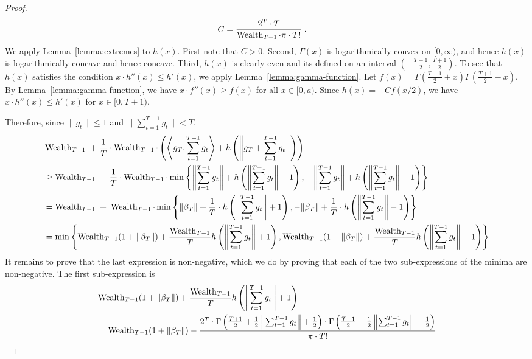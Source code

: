 \begin{proof}
\begin{align*}
C & = \frac{2^T \cdot T}{\operatorname{Wealth}_{T-1} \cdot \pi \cdot T!} \; .
\end{align*}
We apply Lemma~\ref{lemma:extremes} to $h(x)$. First note that $C > 0$. Second,
$\Gamma(x)$ is logarithmically convex on $[0,\infty)$, and hence $h(x)$ is
logarithmically concave and hence concave. Third, $h(x)$ is clearly even and its
defined on an interval $(-\frac{T+1}{2}, \frac{T+1}{2})$. To see that $h(x)$
satisfies the condition $x \cdot h''(x) \le h'(x)$, we apply
Lemma~\ref{lemma:gamma-function}. Let $f(x) = \Gamma(\frac{T+1}{2}+x)
\Gamma(\frac{T+1}{2}-x)$. By Lemma~\ref{lemma:gamma-function}, we have $x \cdot
f''(x) \ge f(x)$ for all $x \in [0,a)$. Since $h(x) = - C f(x/2)$, we have $x
\cdot h''(x) \le h'(x)$ for $x \in [0,T+1)$.

Therefore, since $\|g_t\| \le 1$ and $\|\sum_{t=1}^{T-1} g_t\| < T$,
\begin{align*}
& \operatorname{Wealth}_{T-1} \ + \ \frac{1}{T} \cdot \operatorname{Wealth}_{T-1} \cdot \left( \left\langle g_T, \sum_{t=1}^{T-1} g_t \right\rangle + h\left( \left\|g_T + \sum_{t=1}^{T-1} g_t \right\| \right) \right) \\
& \ge \operatorname{Wealth}_{T-1} \ + \ \frac{1}{T} \cdot \operatorname{Wealth}_{T-1} \cdot \min \left\{ \left\| \sum_{t=1}^{T-1} g_t \right\| + h\left( \left\|\sum_{t=1}^{T-1} g_t \right\| + 1 \right), - \left\| \sum_{t=1}^{T-1} g_t \right\| + h\left(\left\|\sum_{t=1}^{T-1} g_t \right\| - 1 \right) \right\} \\
& = \operatorname{Wealth}_{T-1} \ + \ \operatorname{Wealth}_{T-1} \cdot \min \left\{ \| \beta_T \| + \frac{1}{T} \cdot h\left( \left\|\sum_{t=1}^{T-1} g_t \right\| + 1 \right), - \|\beta_T\| + \frac{1}{T} \cdot h\left(\left\|\sum_{t=1}^{T-1} g_t \right\| - 1 \right) \right\} \\
& = \min \left\{ \operatorname{Wealth}_{T-1} (1 + \| \beta_T \|) + \frac{\operatorname{Wealth}_{T-1}}{T} h\left( \left\|\sum_{t=1}^{T-1} g_t \right\| + 1 \right), \operatorname{Wealth}_{T-1} (1 - \| \beta_T \|) + \frac{\operatorname{Wealth}_{T-1}}{T} h\left(\left\|\sum_{t=1}^{T-1} g_t \right\| - 1 \right) \right\}
\end{align*}
It remains to prove that the last expression is non-negative, which we do by
proving that each of the two sub-expressions of the minima are non-negative. The
first sub-expression is
\begin{align*}
& \Wealth_{T-1} (1 + \| \beta_T \|) + \frac{\Wealth_{T-1}}{T} h\left( \left\|\sum_{t=1}^{T-1} g_t \right\| + 1 \right) \\
& =  \Wealth_{T-1} (1 + \|\beta_T\|) - \frac{2^T \cdot \Gamma \left(\frac{T+1}{2} + \frac{1}{2}\left\|\sum_{t=1}^{T-1} g_t \right\| + \frac{1}{2} \right) \cdot \Gamma \left(\frac{T+1}{2} - \frac{1}{2} \left\|\sum_{t=1}^{T-1} g_t \right\| - \frac{1}{2} \right)}{\pi \cdot T!} \\

\end{align*}
\end{proof}
